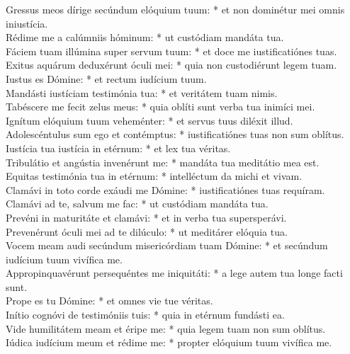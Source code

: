 {	Gressus meos dírige secúndum elóquium tuum: * et non dominétur mei omnis iniustícia. \\
	Rédime me a calúmniis hóminum: * ut custódiam mandáta tua. \\
	Fáciem tuam illúmina super servum tuum: * et doce me iustificatiónes tuas. \\
	Exitus aquárum deduxérunt óculi mei: * quia non custodiérunt legem tuam. \\
	Iustus es Dómine: * et rectum iudícium tuum. \\
	Mandásti iustíciam testimónia tua: * et veritátem tuam nimis. \\
	Tabéscere me fecit zelus meus: * quia oblíti sunt verba tua inimíci mei. \\
	Ignítum elóquium tuum veheménter: * et servus tuus diléxit illud. \\
	Adolescéntulus sum ego et contémptus: * iustificatiónes tuas non sum oblítus. \\
	Iustícia tua iustícia in etérnum: * et lex tua véritas. \\
	Tribulátio et angústia invenérunt me: * mandáta tua meditátio mea est. \\
	Equitas testimónia tua in etérnum: * intelléctum da michi et vivam. \\
	Clamávi in toto corde exáudi me Dómine: * iustificatiónes tuas requíram. \\
	Clamávi ad te, salvum me fac: * ut custódiam mandáta tua. \\
	Prevéni in maturitáte et clamávi: * et in verba tua supersperávi. \\
	Prevenérunt óculi mei ad te dilúculo: * ut meditárer elóquia tua. \\
	Vocem meam audi secúndum misericórdiam tuam Dómine: * et secúndum iudícium tuum vivífica me. \\
	Appropinquavérunt persequéntes me iniquitáti: * a lege autem tua longe facti sunt. \\
	Prope es tu Dómine: * et omnes vie tue véritas. \\
	Inítio cognóvi de testimóniis tuis: * quia in etérnum fundásti ea. \\
	Vide humilitátem meam et éripe me: * quia legem tuam non sum oblítus. \\
	Iúdica iudícium meum et rédime me: * propter elóquium tuum vivífica me. \\
}
